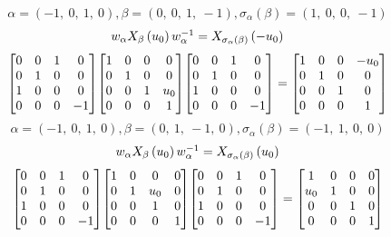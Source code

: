 \documentclass[11pt]{article}
\theoremstyle{definition}
\begin{document}
\[
\alpha = \left( -1, \  0, \  1, \  0\right), \beta = \left( 0, \  0, \  1, \  -1\right), \sigma_{\alpha}(\beta) = \left( 1, \  0, \  0, \  -1\right)
\]
\[
\scaletoalign{\textwidth}{w_{\alpha} X_{\beta}\left(u_{0}\right) w_{\alpha}^{-1} = X_{\sigma_{\alpha}\left(\beta\right)}\left(- u_{0}\right)}
\]
\[
\scaletoalign{\textwidth}{{\left[\begin{matrix}0 & 0 & 1 & 0\\0 & 1 & 0 & 0\\1 & 0 & 0 & 0\\0 & 0 & 0 & -1\end{matrix}\right]} {\left[\begin{matrix}1 & 0 & 0 & 0\\0 & 1 & 0 & 0\\0 & 0 & 1 & u_{0}\\0 & 0 & 0 & 1\end{matrix}\right]} {\left[\begin{matrix}0 & 0 & 1 & 0\\0 & 1 & 0 & 0\\1 & 0 & 0 & 0\\0 & 0 & 0 & -1\end{matrix}\right]} = {\left[\begin{matrix}1 & 0 & 0 & - u_{0}\\0 & 1 & 0 & 0\\0 & 0 & 1 & 0\\0 & 0 & 0 & 1\end{matrix}\right]}}
\]
\[
\alpha = \left( -1, \  0, \  1, \  0\right), \beta = \left( 0, \  1, \  -1, \  0\right), \sigma_{\alpha}(\beta) = \left( -1, \  1, \  0, \  0\right)
\]
\[
\scaletoalign{\textwidth}{w_{\alpha} X_{\beta}\left(u_{0}\right) w_{\alpha}^{-1} = X_{\sigma_{\alpha}\left(\beta\right)}\left(u_{0}\right)}
\]
\[
\scaletoalign{\textwidth}{{\left[\begin{matrix}0 & 0 & 1 & 0\\0 & 1 & 0 & 0\\1 & 0 & 0 & 0\\0 & 0 & 0 & -1\end{matrix}\right]} {\left[\begin{matrix}1 & 0 & 0 & 0\\0 & 1 & u_{0} & 0\\0 & 0 & 1 & 0\\0 & 0 & 0 & 1\end{matrix}\right]} {\left[\begin{matrix}0 & 0 & 1 & 0\\0 & 1 & 0 & 0\\1 & 0 & 0 & 0\\0 & 0 & 0 & -1\end{matrix}\right]} = {\left[\begin{matrix}1 & 0 & 0 & 0\\u_{0} & 1 & 0 & 0\\0 & 0 & 1 & 0\\0 & 0 & 0 & 1\end{matrix}\right]}}
\]
\end{document}
